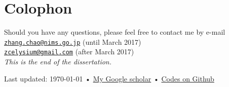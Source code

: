 \chapter*{Colophon}


\begin{center}


Should you have any questions, please feel free to contact me by e-mail\\
\href{mailto:zhang.chao@nims.go.jp}{\nolinkurl{zhang.chao@nims.go.jp}} (until March 2017)\\
\href{mailto:zcelysium@gmail.com}{\nolinkurl{zcelysium@gmail.com}} (after March 2017)\\[10ex]
\emph{This is the end of the dissertation. } \\

\vfill{}

{\scriptsize  Last updated: \today\- •\- 
\href{https://scholar.google.com/citations?hl=en&user=_tirUeIAAAAJ&view_op=list_works&sortby=pubdate}{My Google scholar}\- •\- 
\href{https://github.com/zczczcle/PhDDissertation}{Codes on Github}}

\end{center}